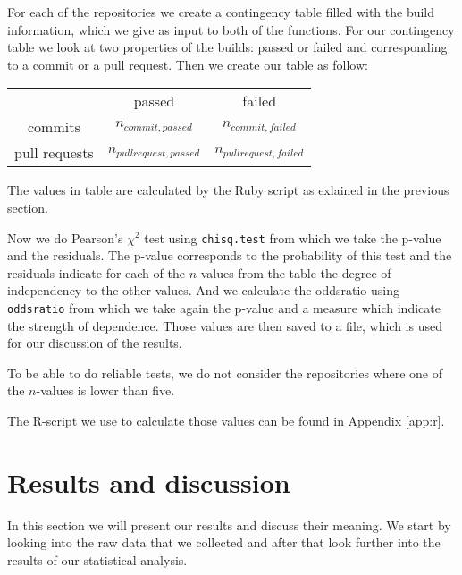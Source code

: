 \documentclass[a4paper,11pt]{article}
\begin{document}
			For each of the repositories we create a contingency table filled with the build information,
			which we give as input to both of the functions.
			For our contingency table we look at two properties of the builds: passed or failed and corresponding to a commit or
			a pull request.
			Then we create our table as follow:
			
			\begin{center}
			\begin{tabular}{ccc}
			 & passed & failed\\
			commits & $n_{commit, passed}$ & $n_{commit, failed}$\\
			pull requests & $n_{pull request, passed}$ & $n_{pull request, failed}$
			\end{tabular}
			\end{center}
			
			The values in table are calculated by the Ruby script as exlained in the previous section.
			
			Now we do Pearson's $\chi^2$ test using \texttt{chisq.test} from which we take the p-value and the residuals.
			The p-value corresponds to the probability of this test and the residuals indicate for each of the $n$-values from
			the table the degree of independency to the other values.
			And we calculate the oddsratio using \texttt{oddsratio} from which we take again the p-value and a measure which
			indicate the strength of dependence.
		  Those values are then saved to a file, which is used for our discussion of the results.
		  
		  To be able to do reliable tests, we do not consider the repositories where one of the $n$-values is lower than five.
		  
		  The R-script we use to calculate those values can be found in Appendix \ref{app:r}.
			
	
	\section{Results and discussion}
		In this section we will present our results and discuss their meaning. We start by looking into the raw data that we collected and after that look further into the results of our statistical analysis.
		
\end{document}
